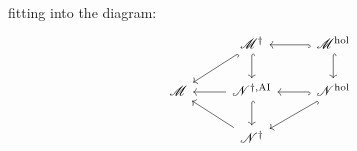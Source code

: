 \documentclass[10pt, oneside]{amsart}
\numberwithin{equation}{subsection}
\theoremstyle{definition}
\theoremstyle{remark}
\newcommand{\opn}[1]{\operatorname{#1}}
\begin{document}
fitting into the diagram:
\[
\begin{tikzcd}
            & \mathscr{M}^{\dagger} \arrow[d, hook] \arrow[ld, hook]      & \mathscr{M}^{\opn{hol}} \arrow[l, hook] \arrow[d, hook]  \\
\mathscr{M} & {\mathscr{N}^{\dagger, \opn{AI}}} \arrow[d, hook] \arrow[l] & \mathscr{N}^{\opn{hol}} \arrow[l, hook] \arrow[ld, hook] \\
            & \mathscr{N}^{\dagger} \arrow[lu]                            &                                                         
\end{tikzcd}
\]



\providecommand{\bysame}{\leavevmode\hbox to3em{\hrulefill}\thinspace}
\providecommand{\MR}{\relax\ifhmode\unskip\space\fi MR }
\providecommand{\MRhref}[2]{%
  \href{http://www.ams.org/mathscinet-getitem?mr=#1}{#2}
}
\providecommand{\href}[2]{#2}
\end{document}
